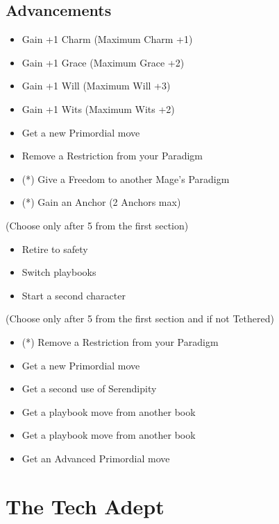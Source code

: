 \documentclass[
]{memoir}
\begin{document}
\hypertarget{advancements-5}{%
\subsection{Advancements}\label{advancements-5}}

\begin{itemize}
\tightlist
\item
  Gain +1 Charm (Maximum Charm +1)
\item
  Gain +1 Grace (Maximum Grace +2)
\item
  Gain +1 Will (Maximum Will +3)
\item
  Gain +1 Wits (Maximum Wits +2)
\item
  Get a new Primordial move
\item
  Remove a Restriction from your Paradigm
\item
  (*) Give a Freedom to another Mage's Paradigm
\item
  (*) Gain an Anchor (2 Anchors max)
\end{itemize}

(Choose only after 5 from the first section)

\begin{itemize}
\tightlist
\item
  Retire to safety
\item
  Switch playbooks
\item
  Start a second character
\end{itemize}

(Choose only after 5 from the first section and if not Tethered)

\begin{itemize}
\tightlist
\item
  (*) Remove a Restriction from your Paradigm
\item
  Get a new Primordial move
\item
  Get a second use of Serendipity
\item
  Get a playbook move from another book
\item
  Get a playbook move from another book
\item
  Get an Advanced Primordial move
\end{itemize}

\newpage

\hypertarget{the-tech-adept}{%
\section{The Tech Adept}\label{the-tech-adept}}
\end{document}
